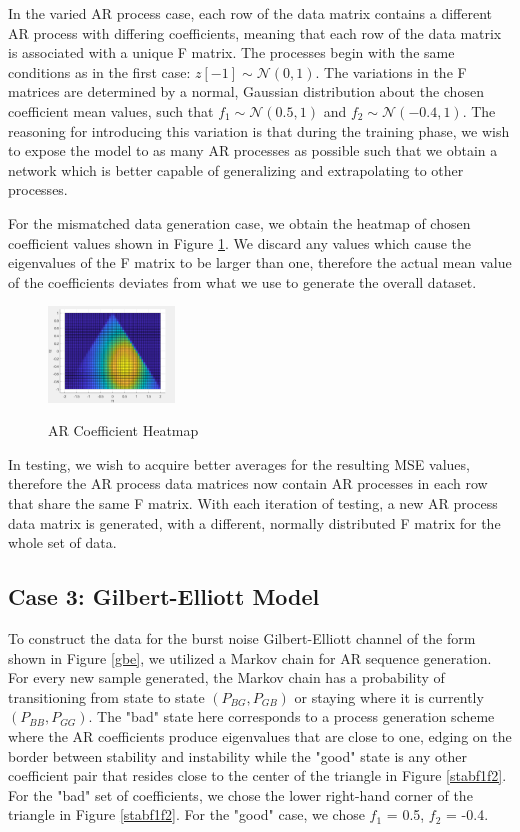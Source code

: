 \documentclass[twocolumn,letterpaper]{IEEEAerospaceCLS}  %
\begin{document}
In the varied AR process case, each row of the data matrix contains a different AR process with differing coefficients, meaning that each row of the data matrix is associated with a unique F matrix.  The processes begin with the same conditions as in the first case: 
\(
z[-1] \sim \mathcal{N} \mathrm{(0,1)}
\). 
The variations in the F matrices are determined by a normal, Gaussian distribution about the chosen coefficient mean values, such that 
\(
f_1 \sim \mathcal{N} \mathrm{(0.5, 1)} 
\)
and 
\(
f_2 \sim \mathcal{N} \mathrm{(-0.4, 1)}
\). 
The reasoning for introducing this variation is that during the training phase, we wish to expose the model to as many AR processes as possible such that we obtain a network which is better capable of generalizing and extrapolating to other processes. 

For the mismatched data generation case, we obtain the heatmap of chosen coefficient values shown in Figure \ref{heatmap}. We discard any values which cause the eigenvalues of the F matrix to be larger than one, therefore the actual mean value of the coefficients deviates from what we use to generate the overall dataset. 

\begin{figure}[!h]
\centering\includegraphics[width=0.3\textwidth]{figs/heatmap.PNG}\\
\caption{AR Coefficient Heatmap}
\label{heatmap}
\end{figure}

In testing, we wish to acquire better averages for the resulting MSE values, therefore the AR process data matrices now contain AR processes in each row that share the same F matrix. With each iteration of testing, a new AR process data matrix is generated, with a different, normally distributed F matrix for the whole set of data.  

\subsection{Case 3: Gilbert-Elliott Model}

To construct the data for the burst noise Gilbert-Elliott channel of the form shown in Figure \ref{gbe}, we utilized a Markov chain for AR sequence generation. For every new sample generated, the Markov chain has a probability of transitioning from state to state $(P_{BG}, P_{GB})$ or staying where it is currently $(P_{BB}, P_{GG})$. The "bad" state here corresponds to a process generation scheme where the AR coefficients produce eigenvalues that are close to one, edging on the border between stability and instability while the "good" state is any other coefficient pair that resides close to the center of the triangle in Figure \ref{stabf1f2}. For the "bad" set of coefficients, we chose the lower right-hand corner of the triangle in Figure \ref{stabf1f2}. For the "good" case, we chose $f_1$ = 0.5, $f_2$ = -0.4.
\end{document}
